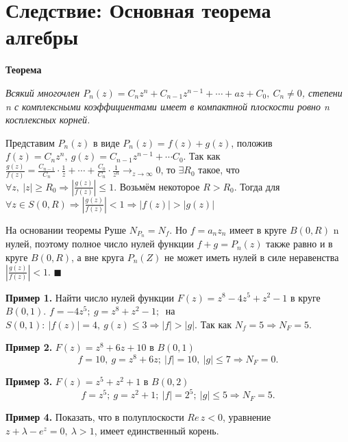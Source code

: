\documentclass[a4paper, 12pt]{report}
\newenvironment{Proof}
{\par\noindent{\bf Доказательство.}}
{\hfill$\scriptstyle\blacksquare$}
\begin{document}
\section{Следствие: Основная теорема алгебры}

\hangindent=11pt  \noindent \textbf{Теорема}

\hangindent=11pt  \noindent \textit{Всякий многочлен $P_n(z) = C_n z^n + C_{n-1} z^{n-1} + \cdots + az + C_0, \ C_n \not= 0$, степени n с комплексными коэффициентами имеет в компактной плоскости ровно n косплексных корней.}
\par\bigskip

\begin{Proof}
Представим $P_n(z)$ в виде $P_n(z) = f(z) + g(z)$, положив $f(z) = C_n z^n, \ g(z) = C_{n-1} z^{n-1} + \cdots C_0$. Так как $\frac{g(z)}{f(z)} = \frac{C_{n-1}}{C_n} \cdot \frac{1}{z} + \cdots + \frac{C_0}{C_n} \cdot \frac{1}{z^n} \longrightarrow_{z\rightarrow \infty} 0$, то $\exists R_0$ такое, что $\forall z, \ |z|\geqslant R_0 \Rightarrow \left| \frac{g(z)}{f(z)} \right| \leqslant 1$. Возьмём некоторое $R > R_0$. Тогда для $\forall z \in S(0, R) \Rightarrow \left| \frac{g(z)}{f(z)} \right| < 1 \Rightarrow |f(z)| > |g(z)|$

На основании теоремы Руше $N_{P_n} = N_f$. Но $f = a_n z_n$ имеет в круге $B(0, R)$ n нулей, поэтому полное число нулей функции $f+g = P_n(z)$ также равно и в круге $B(0,R)$, а вне круга $P_n(Z)$ не может иметь нулей в силе неравенства $\left| \frac{g(z)}{f(z)} \right| < 1$.
\end{Proof}
\par\bigskip

\textbf{Пример 1.} \quad
Найти число нулей функции $F(z) = z^8 - 4z^5 + z^2 - 1$ в круге $B(0,1)$.
$f = -4z^5; \ g = z^8 + z^2 -1; \ $ на $S(0,1): \ |f(z)| = 4, \ g(z) \leqslant 3 \Rightarrow |f| > |g|$. Так как $N_f = 5 \Rightarrow N_F = 5$.
\par\bigskip

\textbf{Пример 2.} \quad
$F(z) = z^8 + 6z + 10$ в $B(0,1)$
$$f = 10,\ g = z^8 + 6z; \ |f| = 10,\ |g| \leqslant 7 \Rightarrow N_F = 0.$$
\par\bigskip

\textbf{Пример 3.} \quad
$F(z) = z^5 + z^2 + 1$ в $B(0,2)$
$$f = z^5;\ g = z^2+1;\ |f| = 2^5;\ |g|\leqslant 5 \Rightarrow N_F = 5.$$
\par\bigskip

\textbf{Пример 4.} \quad
Показать, что в полуплоскости $Re\, z < 0$, уравнение $z+\lambda - e^z = 0,\ \lambda > 1$, имеет единственный корень.
\end{document}
